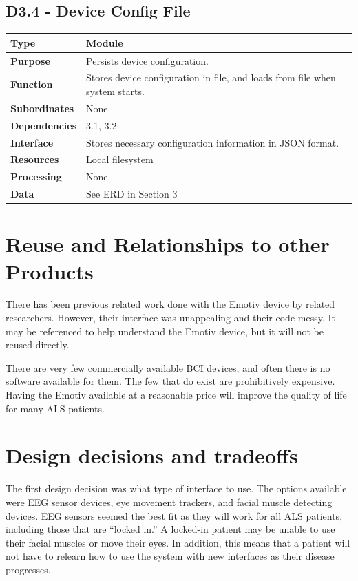 \documentclass{article}
\begin{document}
\subsection*{D3.4 - Device Config File}
\begin{tabular}{ | l |  p{13.3cm} |}
\hline
\textbf{Type} & Module \\ \hline
\textbf{Purpose} & Persists device configuration. \\ \hline
\textbf{Function} & Stores device configuration in file, and loads from file
when system starts. \\ \hline
\textbf{Subordinates} & None \\ \hline
\textbf{Dependencies} & 3.1, 3.2 \\ \hline
\textbf{Interface} & Stores necessary configuration information in JSON
format. \\ \hline
\textbf{Resources} & Local filesystem \\ \hline
\textbf{Processing} & None \\ \hline
\textbf{Data} & See ERD in Section 3 \\ \hline
\end{tabular}

\newpage

\section{Reuse and Relationships to other Products}
\label{sec:ReuseRel}

There has been previous related work done with the Emotiv device by related
researchers. However, their interface was unappealing and their code messy. It
may be referenced to help understand the Emotiv device, but it will not be
reused directly.

There are very few commercially available BCI devices, and often there is no
software available for them. The few that do exist are prohibitively
expensive. Having the Emotiv available at a reasonable price will improve the
quality of life for many ALS patients.

\section{Design decisions and tradeoffs}

The first design decision was what type of interface to use.  The options
available were EEG sensor devices, eye movement trackers, and facial muscle
detecting devices. EEG sensors seemed the best fit as they will work for all
ALS patients, including those that are ``locked in.'' A locked-in patient
may be unable to use their facial muscles or move their eyes. In addition,
this means that a patient will not have to relearn how to use the system
with new interfaces as their disease progresses.
\end{document}
